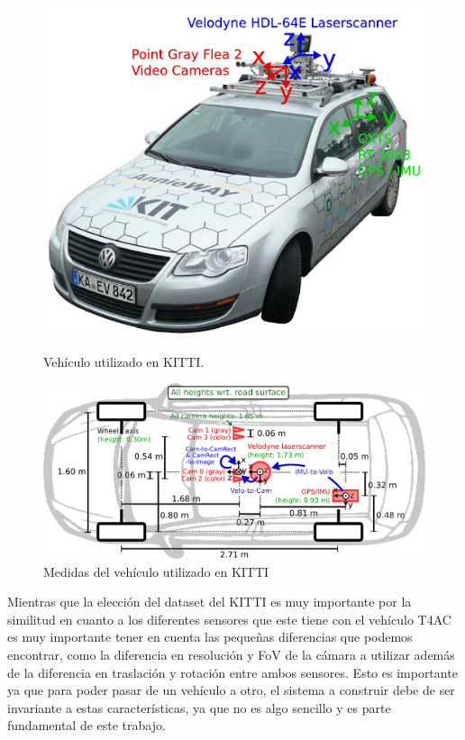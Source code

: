 \begin{figure}[H]
	\begin{minipage}{0.48\textwidth}
		\centering
		\includegraphics[width=0.8\linewidth]{Book/figures/4_kitti/kittis_car.png}
		\caption{Vehículo utilizado en KITTI.}
		\label{fig:Vehiculo_utilizado_en_kitti}
	\end{minipage}\hfill
	\begin{minipage}{0.48\textwidth}
		\centering
		\includegraphics[width=1\linewidth]{Book/figures/4_kitti/kittis_car_measures.png}
		\caption{Medidas del vehículo utilizado en KITTI}
		\label{fig:Medidas_del_vehiculo_utilizado_en_kiti}
	\end{minipage}
\end{figure}

Mientras que la elección del dataset del KITTI es muy importante por la similitud en cuanto a los diferentes sensores que este tiene con el vehículo T4AC es muy importante tener en cuenta las pequeñas diferencias que podemos encontrar, como la diferencia en resolución y \ac{FoV} de la cámara a utilizar además de la diferencia en traslación y rotación entre ambos sensores. Esto es importante ya que para poder pasar de un vehículo a otro, el sistema a construir debe de ser invariante a estas características, ya que no es algo sencillo y es parte fundamental de este trabajo.

